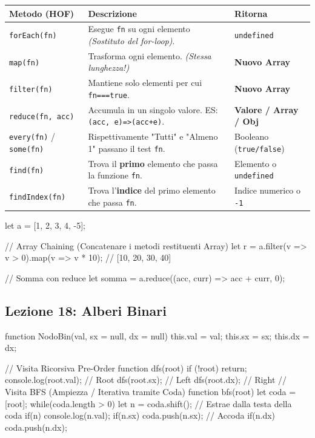 \documentclass[a4paper,10pt]{article}
\begin{document}
\begin{center}
\renewcommand{\arraystretch}{1.5}
\begin{tabular}{|l|p{5cm}|l|}
\hline
\textbf{Metodo (HOF)} & \textbf{Descrizione} & \textbf{Ritorna} \\
\hline
\texttt{forEach(fn)} & Esegue \texttt{fn} su ogni elemento \textit{(Sostituto del for-loop)}. & \texttt{undefined} \\
\hline
\texttt{map(fn)} & Trasforma ogni elemento. \textit{(Stessa lunghezza!)} & \textbf{Nuovo Array} \\
\hline
\texttt{filter(fn)} & Mantiene solo elementi per cui \texttt{fn===true}. & \textbf{Nuovo Array} \\
\hline
\texttt{reduce(fn, acc)} & Accumula in un singolo valore. ES: \texttt{(acc, e)=>(acc+e)}. & \textbf{Valore / Array / Obj} \\
\hline
\texttt{every(fn)} / \texttt{some(fn)} & Rispettivamente "Tutti" e "Almeno 1" passano il test \texttt{fn}. & Booleano (\texttt{true/false}) \\
\hline
\texttt{find(fn)} & Trova il \textbf{primo} elemento che passa la funzione \texttt{fn}. & Elemento o \texttt{undefined} \\
\hline
\texttt{findIndex(fn)} & Trova l'\textbf{indice} del primo elemento che passa \texttt{fn}. & Indice numerico o \texttt{-1} \\
\hline
\end{tabular}
\end{center}

\begin{jsbox}[title={Snippet: Array Chaining e Reduce Avanzato}]
let a = [1, 2, 3, 4, -5];

// Array Chaining (Concatenare i metodi restituenti Array)
let r = a.filter(v => v > 0).map(v => v * 10); // [10, 20, 30, 40]

// Somma con reduce
let somma = a.reduce((acc, curr) => acc + curr, 0); 
\end{jsbox}

\subsection{Lezione 18: Alberi Binari}
\begin{jsbox}[title={Snippet: Nodo e Visite (Pre, In, Post-Order)}]
function NodoBin(val, sx = null, dx = null) {
    this.val = val; this.sx = sx; this.dx = dx;
}

// Visita Ricorsiva Pre-Order
function dfs(root) {
    if (!root) return;
    console.log(root.val); // Root
    dfs(root.sx);          // Left
    dfs(root.dx);          // Right
}
// Visita BFS (Ampiezza / Iterativa tramite Coda)
function bfs(root) {
    let coda = [root];
    while(coda.length > 0) {
        let n = coda.shift(); // Estrae dalla testa della coda
        if(n) {
            console.log(n.val);
            if(n.sx) coda.push(n.sx); // Accoda
            if(n.dx) coda.push(n.dx);
        }
    }
}
\end{jsbox}
\end{document}
